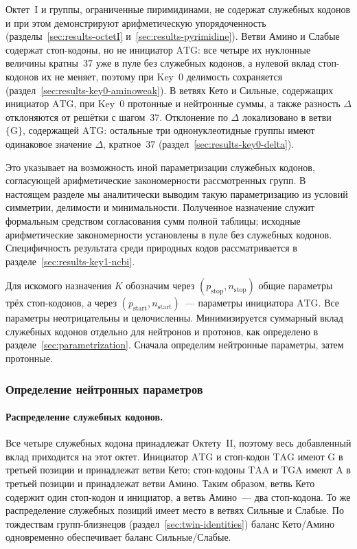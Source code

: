 \documentclass[11pt,a4paper]{article}
\renewcommand{\_}{\origunderscore\allowbreak}
\begin{document}
Октет~I и группы, ограниченные пиримидинами, не содержат
служебных кодонов и при этом демонстрируют арифметическую
упорядоченность (разделы~\ref{sec:results-octetI}
и~\ref{sec:results-pyrimidine}). Ветви Амино и Слабые
содержат стоп-кодоны, но не инициатор $\mathrm{ATG}$: все
четыре их нуклонные величины кратны~$37$ уже в пуле без
служебных кодонов, а нулевой вклад стоп-кодонов их не
меняет, поэтому при Key~0 делимость сохраняется
(раздел~\ref{sec:results-key0-aminoweak}).
В ветвях Кето и Сильные, содержащих инициатор
$\mathrm{ATG}$, при Key~0 протонные и нейтронные суммы, а
также разность $\Delta$ отклоняются от решётки с
шагом~$37$. Отклонение по $\Delta$ локализовано в ветви
$\{\mathrm{G}\}$, содержащей $\mathrm{ATG}$: остальные три
однонуклеотидные группы имеют одинаковое значение
$\Delta$, кратное~$37$
(раздел~\ref{sec:results-key0-delta}).

Это указывает на возможность иной параметризации
служебных кодонов, согласующей арифметические
закономерности рассмотренных групп. В настоящем разделе
мы аналитически выводим такую параметризацию из условий
симметрии, делимости и минимальности. Полученное
назначение служит формальным средством согласования сумм
полной таблицы; исходные арифметические закономерности
установлены в пуле без служебных кодонов. Специфичность
результата среди природных кодов рассматривается в
разделе~\ref{sec:results-key1-ncbi}.

Для искомого назначения $K$ обозначим через
$(p_{\text{stop}}, n_{\text{stop}})$ общие параметры трёх
стоп-кодонов, а через
$(p_{\text{start}}, n_{\text{start}})$~--- параметры
инициатора $\mathrm{ATG}$.
Все параметры неотрицательны и целочисленны.
Минимизируется суммарный вклад служебных кодонов
отдельно для нейтронов и протонов, как определено
в разделе~\ref{sec:parametrization}.
Сначала определим нейтронные параметры, затем протонные.

\subsubsection{Определение нейтронных параметров}
\label{sec:results-key1-neutrons}

\paragraph{Распределение служебных кодонов.}
Все четыре служебных кодона принадлежат Октету~II,
поэтому весь добавленный вклад приходится на этот октет.
Инициатор $\mathrm{ATG}$ и стоп-кодон $\mathrm{TAG}$
имеют $\mathrm{G}$ в третьей позиции и принадлежат
ветви Кето; стоп-кодоны $\mathrm{TAA}$ и $\mathrm{TGA}$
имеют $\mathrm{A}$ в третьей позиции и принадлежат
ветви Амино. Таким образом, ветвь Кето содержит один
стоп-кодон и инициатор, а ветвь Амино~--- два стоп-кодона.
То же распределение служебных позиций имеет место
в ветвях Сильные и Слабые. По тождествам групп-близнецов
(раздел~\ref{sec:twin-identities}) баланс Кето/Амино
одновременно обеспечивает баланс Сильные/Слабые.
\end{document}
